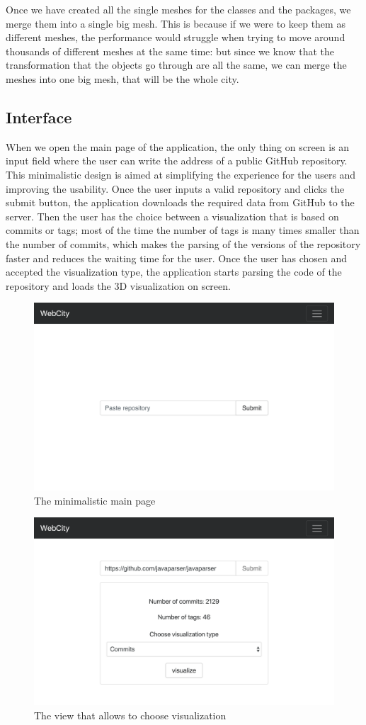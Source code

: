\documentclass[]{usiinfbachelorproject}
\begin{document}
Once we have created all the single meshes for the classes and the packages, we merge them into a single big mesh.
This is because if we were to keep them as different meshes, the performance would struggle when trying to move around thousands of different meshes at the same time: but since we know that the transformation that the objects go through are all the same, we can merge the meshes into one big mesh, that will be the whole city.

\subsection{Interface} \label{Interface}

When we open the main page of the application, the only thing on screen is an input field where the user can write the address of a public GitHub repository. This minimalistic design is aimed at simplifying the experience for the users and improving the usability. Once the user inputs a valid repository and clicks the submit button, the application downloads the required data from GitHub to the server. Then the user has the choice between a visualization that is based on commits or tags; most of the time the number of tags is many times smaller than the number of commits, which makes the parsing of the versions of the repository faster and reduces the waiting time for the user. Once the user has chosen and accepted the visualization type, the application starts parsing the code of the repository and loads the 3D visualization on screen.

\begin{figure}[H]
\centering
  \includegraphics[width=.6\textwidth]{pictures/interface.png}
  \caption{The minimalistic main page}
  \label{fig:interface}
\end{figure}

\begin{figure}[H]
    \centering
  \includegraphics[width=.6\textwidth]{pictures/interface2.png}
  \caption{The view that allows to choose visualization}
  \label{fig:interface2}
\end{figure}
\end{document}
